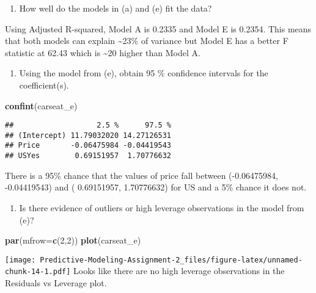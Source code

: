 \documentclass[
]{article}
\newenvironment{Shaded}{\begin{snugshade}}{\end{snugshade}}
\newcommand{\AttributeTok}[1]{\textcolor[rgb]{0.13,0.29,0.53}{#1}}
\newcommand{\DecValTok}[1]{\textcolor[rgb]{0.00,0.00,0.81}{#1}}
\newcommand{\FunctionTok}[1]{\textcolor[rgb]{0.13,0.29,0.53}{\textbf{#1}}}
\newcommand{\NormalTok}[1]{#1}
\providecommand{\tightlist}{%
  \setlength{\itemsep}{0pt}\setlength{\parskip}{0pt}}
\begin{document}
\begin{enumerate}
\def\labelenumi{(\alph{enumi})}
\setcounter{enumi}{5}
\tightlist
\item
  How well do the models in (a) and (e) fit the data?
\end{enumerate}

Using Adjusted R-squared, Model A is 0.2335 and Model E is 0.2354. This
means that both models can explain \textasciitilde23\% of variance but
Model E has a better F statistic at 62.43 which is \textasciitilde20
higher than Model A.

\begin{enumerate}
\def\labelenumi{(\alph{enumi})}
\setcounter{enumi}{6}
\tightlist
\item
  Using the model from (e), obtain 95 \% confidence intervals for the
  coefficient(s).
\end{enumerate}

\begin{Shaded}
\begin{Highlighting}[]
\FunctionTok{confint}\NormalTok{(carseat\_e)}
\end{Highlighting}
\end{Shaded}

\begin{verbatim}
##                   2.5 %      97.5 %
## (Intercept) 11.79032020 14.27126531
## Price       -0.06475984 -0.04419543
## USYes        0.69151957  1.70776632
\end{verbatim}

There is a 95\% chance that the values of price fall between
(-0.06475984, -0.04419543) and ( 0.69151957, 1.70776632) for US and a
5\% chance it does not.

\begin{enumerate}
\def\labelenumi{(\alph{enumi})}
\setcounter{enumi}{7}
\tightlist
\item
  Is there evidence of outliers or high leverage observations in the
  model from (e)?
\end{enumerate}

\begin{Shaded}
\begin{Highlighting}[]
\FunctionTok{par}\NormalTok{(}\AttributeTok{mfrow=}\FunctionTok{c}\NormalTok{(}\DecValTok{2}\NormalTok{,}\DecValTok{2}\NormalTok{))}
\FunctionTok{plot}\NormalTok{(carseat\_e)}
\end{Highlighting}
\end{Shaded}

\texttt{[image: Predictive-Modeling-Assignment-2\_files/figure-latex/unnamed-chunk-14-1.pdf]}
Looks like there are no high leverage observations in the Residuals vs
Leverage plot.
\end{document}
